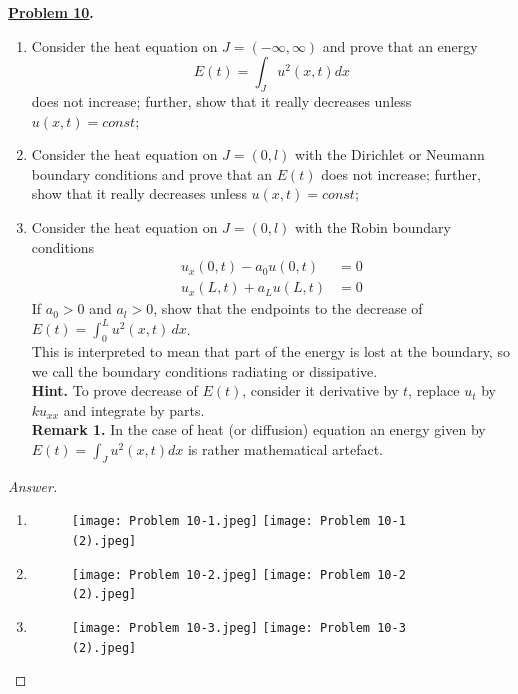 \documentclass{article}
\theoremstyle{definition}
\renewcommand\qedsymbol{$\blacksquare$}
\newenvironment{ans}{\begin{proof}[Answer]\renewcommand{\qedsymbol}{}}{\end{proof}}
\newenvironment{boldenv}{\bfseries\boldmath}{}
\begin{document}
\begin{boldenv}
    \underline{Problem 10}. \begin{enumerate}
        \item Consider the heat equation on $J = (-\infty, \infty)$ and prove that an energy
        \[ E(t) = \int_J u^2(x, t) dx \]
        does not increase; further, show that it really decreases unless $u(x,t) = const$;
        \item Consider the heat equation on $J = (0, l)$ with the Dirichlet or Neumann boundary conditions and prove that an $E(t)$ does not increase; further, show that it really decreases unless $u(x,t) = const$;
        \item Consider the heat equation on $J = (0, l)$ with the Robin boundary conditions \begin{align}
            u_x(0, t) - a_0u(0,t) &= 0\\
            u_x(L,t) + a_Lu(L,t) &= 0
        \end{align}
        If $a_0 > 0$ and $a_l > 0$, show that the endpoints to the decrease of $E(t) = \int_0^L u^2(x, t)\,dx$.\\
        This is interpreted to mean that part of the energy is lost at the boundary, so we call the boundary conditions radiating or dissipative.\\
        \textbf{Hint.} To prove decrease of $E(t)$, consider it derivative by $t$, replace $u_t$ by $ku_{xx}$ and integrate by parts.\\
        \textbf{Remark 1.} In the case of heat (or diffusion) equation an energy given by $E(t) = \int_J u^2(x, t) dx$ is rather mathematical artefact.
    \end{enumerate}
\end{boldenv}
\newpage
\begin{ans}
\begin{enumerate}
    \item \phantom{.}
    \begin{figure}[H]
        \centering
        \texttt{[image: Problem 10-1.jpeg]}
        \texttt{[image: Problem 10-1 (2).jpeg]}
    \end{figure}

    \item \phantom{.}
    \begin{figure}[H]
        \centering
        \texttt{[image: Problem 10-2.jpeg]}
        \texttt{[image: Problem 10-2 (2).jpeg]}
    \end{figure}
    \newpage
    \item \phantom{.}
    \begin{figure}[H]
        \centering
        \texttt{[image: Problem 10-3.jpeg]}
        \texttt{[image: Problem 10-3 (2).jpeg]}
    \end{figure}
\end{enumerate}
    
\end{ans}
\end{document}
